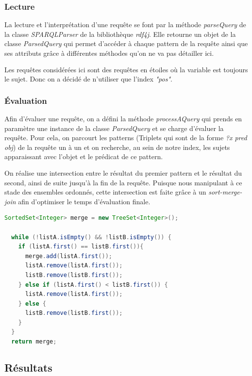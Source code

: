 \documentclass[12pt,titlepage]{article}
\begin{document}
\subsubsection{Lecture}

La lecture et l'interprétation d'une requête se font par la méthode \textit{parseQuery} de la classe \textit{SPARQLParser} de la bibliothèque \textit{rdf4j}. Elle retourne un objet de la classe \textit{ParsedQuery} qui permet d'accéder à chaque pattern de la requête ainsi que ses attributs grâce à différentes méthodes qu'on ne va pas détailler ici.

Les requêtes considérées ici sont des requêtes en étoiles où la variable est toujours le sujet. Donc on a décidé de n'utiliser que l'index \textit{"pos"}.

\subsubsection{Évaluation}

Afin d'évaluer une requête, on a défini la méthode \textit{processAQuery} qui prends en paramètre une instance de la classe \textit{ParsedQuery} et se charge d'évaluer la requête. Pour cela, on parcourt les patterns (Triplets qui sont de la forme \textit{?x pred obj}) de la requête un à un et on recherche, au sein de notre index, les sujets apparaissant avec l'objet et le prédicat de ce pattern.

On réalise une intersection entre le résultat du premier pattern et le résultat du second, ainsi de suite jusqu'à la fin de la requête. Puisque nous manipulant à ce stade des ensembles ordonnés, cette intersection est faite grâce à un \textit{sort-merge-join} afin d'optimiser le temps d'évaluation finale.

\begin{lstlisting}[language=Java, caption="Sort merge join de deux listes"]
  SortedSet<Integer> merge = new TreeSet<Integer>();

  while (!listA.isEmpty() && !listB.isEmpty()) {
    if (listA.first() == listB.first()){
      merge.add(listA.first());
      listA.remove(listA.first());
      listB.remove(listB.first());
    } else if (listA.first() < listB.first()) {
      listA.remove(listA.first());
    } else {
      listB.remove(listB.first());
    }
  }
  return merge;
\end{lstlisting}

\subsection{Résultats}
\end{document}
